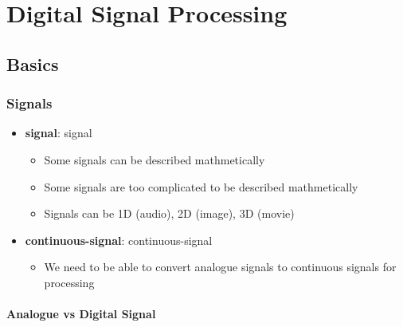 \chapter{Digital Signal Processing}

\section{Basics}

  \subsection{Signals}

  \begin{itemize}
    \item \textbf{\Gls{signal}}: \glsdesc{signal}
      \begin{itemize}
        \item Some signals can be described mathmetically
        \item Some signals are too complicated to be described mathmetically
        \item Signals can be 1D (audio), 2D (image), 3D (movie)
      \end{itemize}

      \item \textbf{\Gls{continuous-signal}}: \glsdesc{continuous-signal}
      \begin{itemize}
        \item We need to be able to convert analogue signals to continuous signals
        for processing
      \end{itemize}
    \end{itemize}

    \subsubsection{Analogue vs Digital Signal}

